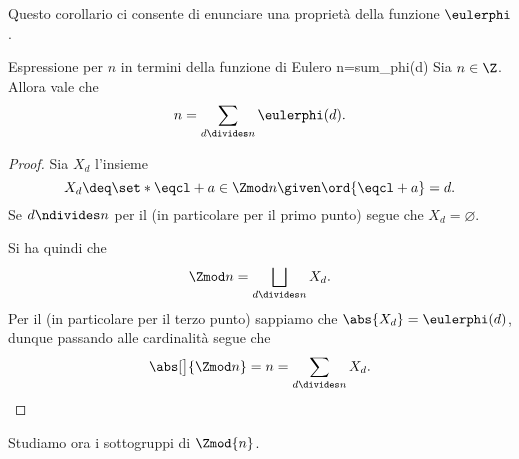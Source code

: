 Questo corollario ci consente di enunciare una proprietà della funzione $\eulerphi$.

\begin{corollary}
    {Espressione per $n$ in termini della funzione di Eulero}
    {n=sum_phi(d)}
    Sia $n \in \Z$. Allora vale che \[
        n = \sum_{d \divides n} \eulerphi(d).    
    \]
\end{corollary}
\begin{proof}
    Sia $X_d$ l'insieme \[
        X_d \deq \set*{\eqcl+ a \in \Zmod n \given \ord{\eqcl+ a} = d}.    
    \]
    Se $d \ndivides n$ per il  (in particolare per il primo punto) segue che $X_d = \varnothing$.

    Si ha quindi che \[
        \Zmod n = \bigsqcup_{d \divides n} X_d.  
    \] Per il  (in particolare per il terzo punto) sappiamo che $\abs{X_d} = \eulerphi(d)$, dunque passando alle cardinalità segue che \[
        \abs[\big]{\Zmod n} = n = \sum_{d \divides n} X_d. \qedhere
    \]
\end{proof}

Studiamo ora i sottogruppi di $\Zmod{n}$.

